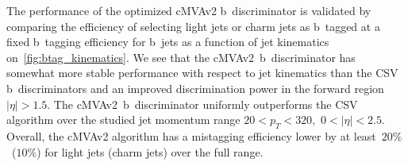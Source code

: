 The performance of the optimized cMVAv2 b~discriminator is validated by comparing the efficiency of selecting light jets or charm jets as b~tagged at a fixed b~tagging efficiency for b~jets as a function of jet kinematics on~\cref{fig:btag_kinematics}. We see that the cMVAv2~b~discriminator has somewhat more stable performance with respect to jet kinematics than the CSV b~discriminators and an improved discrimination power in the forward region $|\eta| > 1.5$. The cMVAv2~b~discriminator uniformly outperforms the CSV algorithm over the studied jet momentum range $20 < p_T < 320$,~$0 < |\eta| < 2.5$. Overall, the cMVAv2 algorithm has a mistagging efficiency lower by at least~$20\%$~($10\%$) for light jets (charm jets) over the full range.

\begin{figure}
\begin{centering}
 \\

\end{centering}
\end{figure}
